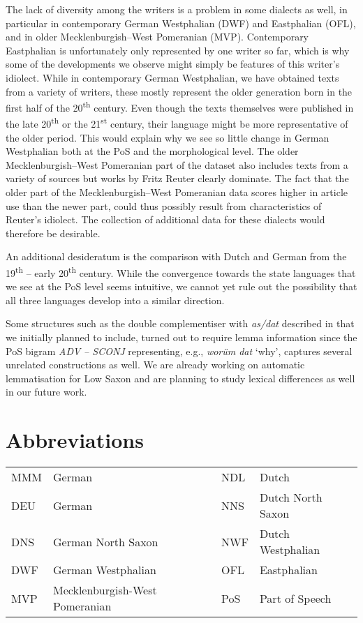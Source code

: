 \documentclass[output=paper,colorlinks,citecolor=brown]{langscibook}
\begin{document}
The lack of diversity among the writers is a problem in some dialects as well, in particular in contemporary German Westphalian (DWF) and Eastphalian (OFL), and in older Mecklenburgish--West Pomeranian (MVP). Contemporary Eastphalian is unfortunately only represented by one writer so far, which is why some of the developments we observe might simply be features of this writer's idiolect. While in contemporary German Westphalian, we have obtained texts from a variety of writers, these mostly represent the older generation born in the first half of the 20\textsuperscript{th} century. Even though the texts themselves were published in the late 20\textsuperscript{th} or the 21\textsuperscript{st} century, their language might be more representative of the older period. This would explain why we see so little change in German Westphalian both at the PoS and the morphological level. 
The older Mecklenburgish--West Pomeranian part of the dataset also includes texts from a variety of sources but works by Fritz Reuter clearly dominate. The fact that the older part of the Mecklenburgish--West Pomeranian data scores higher in article use than the newer part, could thus possibly result from characteristics of Reuter's idiolect.
The collection of additional data for these dialects would therefore be desirable.

An additional desideratum is the comparison with Dutch and German from the 19\textsuperscript{th} -- early 20\textsuperscript{th} century. While the convergence towards the state languages that we see at the PoS level seems intuitive, we cannot yet rule out the possibility that all three languages develop into a similar direction.

Some structures such as the double complementiser with \textit{as/dat} described in  that we initially planned to  include, turned out to require lemma information since the PoS bigram \textit{ADV -- SCONJ} representing, e.g., \textit{worüm dat} `why', captures several unrelated constructions as well. We are already working on automatic lemmatisation for Low Saxon and are planning to study lexical differences as well in our future work. 



\section*{Abbreviations}
\begin{tabular}{@{}llll@{}}
MMM & German                         & NDL & Dutch\\
DEU & German                         & NNS & Dutch North Saxon\\
DNS & German North Saxon             & NWF & Dutch Westphalian\\
DWF & German Westphalian             & OFL & Eastphalian \\
MVP & Mecklenburgish-West Pomeranian & PoS & Part of Speech\\
\end{tabular}
\end{document}
